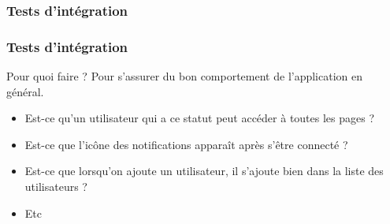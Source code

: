 \documentclass{beamer}
\begin{document}
      \subsubsection{Tests d'intégration}
      \begin{frame}
        \frametitle{Tests d'intégration}
        \begin{block}{Pour quoi faire ?}
          Pour s'assurer du bon comportement de l'application en général.
          \begin{itemize}
            \item Est-ce qu'un utilisateur qui a ce statut peut accéder à toutes les pages ?
            \item Est-ce que l'icône des notifications apparaît après s'être connecté ?
            \item Est-ce que lorsqu'on ajoute un utilisateur, il s'ajoute bien dans la liste des utilisateurs ?
            \item Etc
          \end{itemize}
        \end{block}
      \end{frame}
\end{document}
